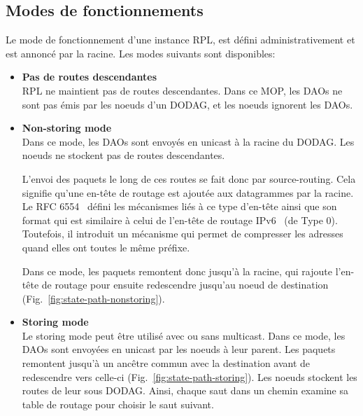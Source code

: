 \subsection*{Modes de fonctionnements}\label{subsec:state-mop}
    Le mode de fonctionnement d'une instance RPL, est défini administrativement et est annoncé par la racine. Les modes suivants sont disponibles:
    \begin{itemize}
        \item \textbf{Pas de routes descendantes}\\
            RPL ne maintient pas de routes descendantes. Dans ce MOP, les DAOs ne sont pas émis par les noeuds d'un DODAG, et les noeuds ignorent les DAOs.
        \item \textbf{Non-storing mode}\\
            Dans ce mode, les DAOs sont envoyés en unicast à la racine du DODAG.
            Les noeuds ne stockent pas de routes descendantes.
            
            L'envoi des paquets le long de ces routes se fait donc par source-routing. Cela signifie qu'une en-tête de routage est ajoutée aux datagrammes par la racine. Le RFC 6554~\cite{rfc:rpl-routing-header} défini les mécanismes liés à ce type d'en-tête ainsi que son format qui est similaire à celui de l'en-tête de routage IPv6~\cite{rfc:ipv6} (de Type 0). Toutefois, il introduit un mécanisme qui permet de compresser les adresses quand elles ont toutes le même préfixe.

            Dans ce mode, les paquets remontent donc jusqu'à la racine, qui rajoute l'en-tête de routage pour ensuite redescendre jusqu'au noeud de destination (Fig.~\ref{fig:state-path-nonstoring}).
        \item \textbf{Storing mode}\\
            Le storing mode peut être utilisé avec ou sans multicast.
            Dans ce mode, les DAOs sont envoyées en unicast par les noeuds à leur parent.
            Les paquets remontent jusqu'à un ancêtre commun avec la destination avant de redescendre vers celle-ci (Fig.~\ref{fig:state-path-storing}).
            Les noeuds stockent les routes de leur sous DODAG. Ainsi, chaque saut dans un chemin examine sa table de routage pour choisir le saut suivant.
    \end{itemize}
    
